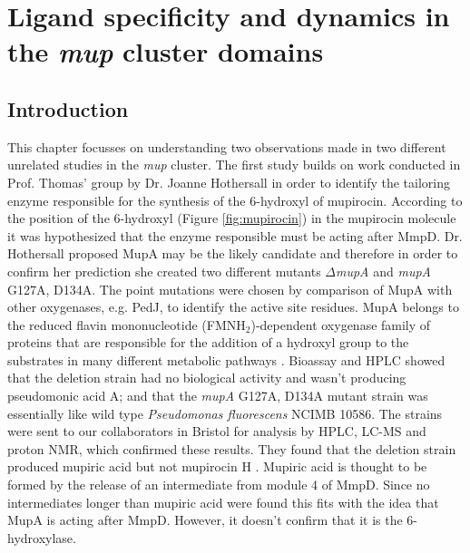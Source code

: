 \chapter{Ligand specificity and dynamics in the \textit{mup} cluster domains}
\label{cha:chap6}

\section{Introduction}
\label{sec:chap6-Intro}
This chapter focusses on understanding two observations made in two different unrelated studies in the \textit{mup} cluster. The first study builds on work conducted in Prof. Thomas' group by Dr. Joanne Hothersall in order to identify the tailoring enzyme responsible for the synthesis of the 6-hydroxyl of mupirocin. According to the position of the 6-hydroxyl (Figure \ref{fig:mupirocin}) in the mupirocin molecule it was hypothesized that the enzyme responsible must be acting after MmpD. Dr. Hothersall proposed MupA may be the likely candidate and therefore in order to confirm her prediction she created two different mutants \textit{$ \Delta $mupA} and \textit{mupA} G127A, D134A. The point mutations were chosen by comparison of MupA with other oxygenases, e.g. PedJ, to identify the active site residues. MupA belongs to the reduced flavin mononucleotide (FMNH$ _{2} $)-dependent oxygenase family of proteins that are responsible for the addition of a hydroxyl group to the substrates in many different metabolic pathways \parencite{El-Sayed2003}. Bioassay and HPLC showed that the deletion strain had no biological activity and wasn't producing pseudomonic acid A; and that the \textit{mupA} G127A, D134A mutant strain was essentially like wild type \textit{Pseudomonas fluorescens} NCIMB 10586. The strains were sent to our collaborators in Bristol for analysis by HPLC, LC-MS and proton NMR, which confirmed these results. They found that the deletion strain produced mupiric acid but not mupirocin H \parencite{Wu2008}. Mupiric acid is thought to be formed by the release of an intermediate from module 4 of MmpD. Since no intermediates longer than mupiric acid were found this fits with the idea that MupA is acting after MmpD. However, it doesn't confirm that it is the 6-hydroxylase. 

